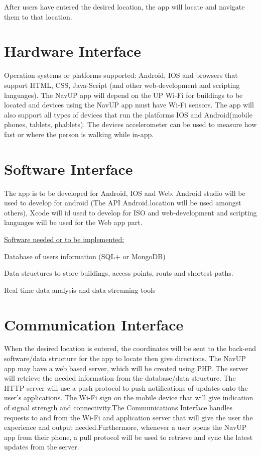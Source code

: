 \documentclass[11pt]{article}
\begin{document}
After users have entered the desired location, the app will locate and navigate them to that location. 



\section{Hardware Interface}
{\raggedright
Operation systems or platforms supported: Android, IOS and browsers that support
HTML, CSS, Java-Script (and other web-development and scripting languages). The
NavUP app will depend on the UP Wi-Fi for buildings to be located and devices
using the NavUP app must have Wi-Fi sensors.
The app will also support all types of devices that run the platforms IOS and Android(mobile phones, tablets, phablets). The devices accelerometer can be used to measure how fast or where the person is walking while in-app.
}

\section{Software Interface}
{\raggedright
The app is to be developed for Android, IOS and Web. Android studio will be used
to develop for android (The API Android.location will be used amongst others),
Xcode will id used to develop for ISO and web-development and scripting languages
will be used for the Web app part.
}

{\raggedright

\uline{Software needed or to be implemented:}
}

{\raggedright
Database of users information (SQL+ or MongoDB)
}

{\raggedright
Data structures to store buildings, access points, routs and shortest paths.
}

{\raggedright
Real time data analysis and data streaming tools
}

\section{Communication Interface}
{\raggedright
When the desired location is entered, the coordinates will be sent to the
back-end software/data structure for the app to locate then give directions. The
NavUP app may have a web based server, which will be created using PHP. The
server will retrieve the needed information from the database/data structure. The
HTTP server will use a push protocol to push notifications of updates onto the
user's applications. The Wi-Fi sign on the mobile device that will give indication of signal strength and connectivity.The Communications Interface handles requests to and from the Wi-Fi and application server that will give the user the experience and output needed.Furthermore, whenever a user opens the NavUP app from their
phone, a pull protocol will be used to retrieve and sync the latest updates from
the server.
}
\end{document}
